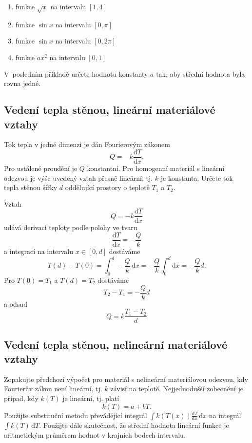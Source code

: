 \begin{enumerate}[(1)]
\item funkce $\sqrt x$ na intervalu $[1,4]$
\item funkce $\sin x$ na intervalu $[0,\pi]$
\item funkce $\sin x$ na intervalu $[0,2\pi]$
\item funkce $ax^2$ na intervalu $[0,1]$
\end{enumerate}

V posledním příkladě určete hodnotu konstanty $a$ tak, aby střední hodnota byla rovna jedné.

\stranka
\subsection{Vedení tepla stěnou, lineární materiálové vztahy}

Tok tepla v jedné dimenzi je dán Fourierovým zákonem $$Q=-k\frac{\mathrm dT}{\mathrm dx}.$$ Pro ustálené proudění je $Q$ konstantní. Pro homogenní materiál s lineární odezvou je výše uvedený vztah přesně lineární, tj. $k$ je konstanta. Určete tok tepla stěnou šířky $d$ oddělující prostory o teplotě $T_1$ a $T_2$.

\reseni

Vztah
$$Q=-k\frac{\mathrm dT}{\mathrm dx}$$
udává derivaci teploty podle polohy ve tvaru
$$\frac{\mathrm dT}{\mathrm dx}=-\frac Qk$$
a integrací na intervalu $x\in [0,d]$ dostáváme
$$T(d)-T(0)=\int _0^d -\frac Qk\,\mathrm dx=-\frac Qk\int _0^d \mathrm dx=
-\frac Qk d.$$
Pro $T(0)=T_1$ a $T(d)=T_2$ dostáváme
$$T_2-T_1=-\frac Qk d$$
a odsud
$$Q=k\frac{T_1-T_2}d$$

\konec

\stranka
\subsection{Vedení tepla stěnou, nelineární materiálové vztahy}

Zopakujte předchozí výpočet pro materiál s nelineární materiálovou odezvou, kdy Fourierův zákon není lineární, tj. $k$ závisí na teplotě. Nejjednodušší zobecnění je případ, kdy $k(T)$ je lineární, tj. platí $$k(T)=a+bT.$$ Použijte substituční metodu převádějící integrál $\int k(T(x))\frac{\mathrm dT}{\mathrm dx}\,\mathrm dx$ na integrál $\int k(T)\,\mathrm dT.$ Použijte dále skutečnost, že střední hodnota lineární funkce je aritmetickým průměrem hodnot v krajních bodech intervalu.

